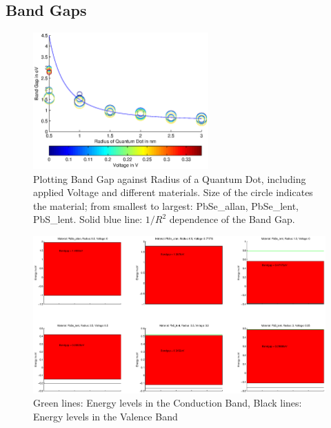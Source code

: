 \documentclass[a4paper, 11pt, landscape]{article}
\begin{document}
		
		\newpage
		\subsection{Band Gaps}
			\begin{figure}[htbp]
				\centering
				\includegraphics[width=0.6\textwidth]{figures/BandGapAll.eps}
				\caption{Plotting Band Gap against Radius of a Quantum Dot, including applied Voltage and 
								 different materials. Size of the circle indicates the material; from smallest to largest:
								 PbSe\_allan, PbSe\_lent, PbS\_lent. Solid blue line: $1/R^2$ dependence of the Band Gap.}
			\end{figure}
			
			\newpage
			\begin{figure}[htbp]
				\centering
				\includegraphics[width=\textwidth]{figures/BandGapsSelected.eps}
				\caption{Green lines: Energy levels in the Conduction Band, Black lines: Energy levels in the Valence Band}
			\end{figure}
\end{document}
